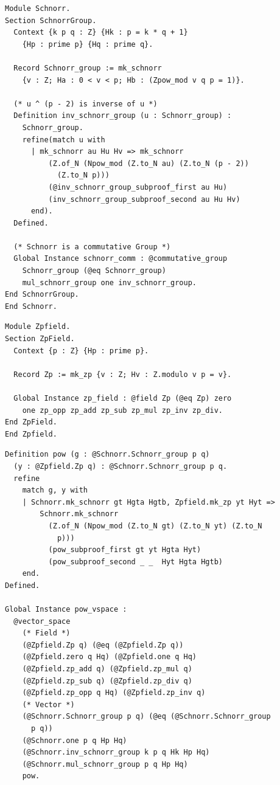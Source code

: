 \begin{lstlisting}[frame=single, language=Coq, caption={Rocq encoding of the Schnorr group ({\rocq[\texttt{Utility/Zpstar.v}]{Schnorr}})},
  label={group_def},captionpos=t, basicstyle=\ttfamily\scriptsize,
  abovecaptionskip=-\medskipamount]
Module Schnorr.
Section SchnorrGroup.
  Context {k p q : Z} {Hk : p = k * q + 1}
    {Hp : prime p} {Hq : prime q}.

  Record Schnorr_group := mk_schnorr
    {v : Z; Ha : 0 < v < p; Hb : (Zpow_mod v q p = 1)}.

  (* u ^ (p - 2) is inverse of u *)
  Definition inv_schnorr_group (u : Schnorr_group) :
    Schnorr_group.
    refine(match u with
      | mk_schnorr au Hu Hv => mk_schnorr
          (Z.of_N (Npow_mod (Z.to_N au) (Z.to_N (p - 2))
            (Z.to_N p)))
          (@inv_schnorr_group_subproof_first au Hu)
          (inv_schnorr_group_subproof_second au Hu Hv)
      end).
  Defined.

  (* Schnorr is a commutative Group *)
  Global Instance schnorr_comm : @commutative_group
    Schnorr_group (@eq Schnorr_group)
    mul_schnorr_group one inv_schnorr_group.
End SchnorrGroup.
End Schnorr.
\end{lstlisting}

\begin{lstlisting}[frame=single, language=Coq, caption={Rocq encoding of the prime field ({\rocq[\texttt{Utility/Zpstar.v}]{Zpfield}})},
  label={field_def},captionpos=t, basicstyle=\ttfamily\scriptsize,
  abovecaptionskip=-\medskipamount]
Module Zpfield.
Section ZpField.
  Context {p : Z} {Hp : prime p}.

  Record Zp := mk_zp {v : Z; Hv : Z.modulo v p = v}.

  Global Instance zp_field : @field Zp (@eq Zp) zero
    one zp_opp zp_add zp_sub zp_mul zp_inv zp_div.
End ZpField.
End Zpfield.
\end{lstlisting}

\begin{lstlisting}[frame=single, language=Coq, caption={Vector space instantiation ({\rocq[\texttt{Utility/Zpstar.v}]{pow}})},
  label={vec_space},captionpos=t, basicstyle=\ttfamily\scriptsize,
  abovecaptionskip=-\medskipamount]
Definition pow (g : @Schnorr.Schnorr_group p q)
  (y : @Zpfield.Zp q) : @Schnorr.Schnorr_group p q.
  refine
    match g, y with
    | Schnorr.mk_schnorr gt Hgta Hgtb, Zpfield.mk_zp yt Hyt =>
        Schnorr.mk_schnorr
          (Z.of_N (Npow_mod (Z.to_N gt) (Z.to_N yt) (Z.to_N
            p)))
          (pow_subproof_first gt yt Hgta Hyt)
          (pow_subproof_second _ _  Hyt Hgta Hgtb)
    end.
Defined.

Global Instance pow_vspace :
  @vector_space
    (* Field *)
    (@Zpfield.Zp q) (@eq (@Zpfield.Zp q))
    (@Zpfield.zero q Hq) (@Zpfield.one q Hq)
    (@Zpfield.zp_add q) (@Zpfield.zp_mul q)
    (@Zpfield.zp_sub q) (@Zpfield.zp_div q)
    (@Zpfield.zp_opp q Hq) (@Zpfield.zp_inv q)
    (* Vector *)
    (@Schnorr.Schnorr_group p q) (@eq (@Schnorr.Schnorr_group
      p q))
    (@Schnorr.one p q Hp Hq)
    (@Schnorr.inv_schnorr_group k p q Hk Hp Hq)
    (@Schnorr.mul_schnorr_group p q Hp Hq)
    pow.
\end{lstlisting}
